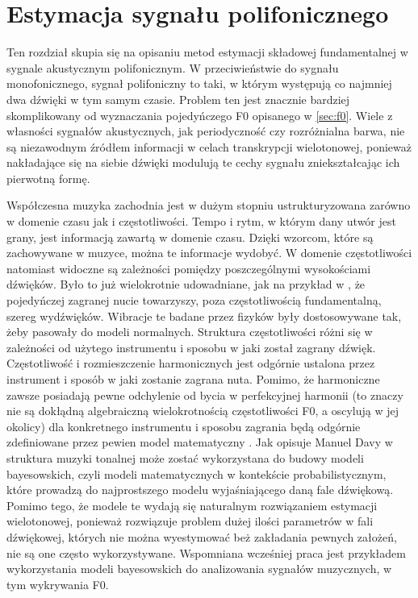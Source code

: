 \documentclass[12pt,a4paper,twoside]{mwart}
\begin{document}
\clearpage
\section{Estymacja sygnału polifonicznego}\label{sec:MultiPitch}
Ten rozdział skupia się na opisaniu metod estymacji składowej fundamentalnej w sygnale akustycznym polifonicznym. W przeciwieństwie do sygnału monofonicznego,  sygnał polifoniczny to taki, w którym występują co najmniej dwa dźwięki w tym samym czasie. Problem ten jest znacznie bardziej skomplikowany od wyznaczania pojedyńczego F0 opisanego w \ref{sec:f0}. Wiele z własności sygnałów akustycznych, jak periodyczność czy rozróżnialna barwa, nie są niezawodnym źródłem informacji w celach transkrypcji wielotonowej, ponieważ nakładające się na siebie dźwięki modulują te cechy sygnału zniekształcając ich pierwotną formę.

Współczesna muzyka zachodnia jest w dużym stopniu ustrukturyzowana zarówno w domenie czasu jak i częstotliwości. Tempo i rytm, w którym dany utwór jest grany, jest informacją zawartą w domenie czasu. Dzięki wzorcom, które są zachowywane w muzyce, można te informacje wydobyć. W domenie częstotliwości natomiast widoczne są zależności pomiędzy poszczególnymi wysokościami dźwięków. Było to już wielokrotnie udowadniane, jak na przykład w \cite[1325-1326]{Transcription:Mcintyre:OnTheOscilation}, że pojedyńczej zagranej nucie towarzyszy, poza częstotliwością fundamentalną, szereg wydźwięków. Wibracje te badane przez fizyków były dostosowywane tak, żeby pasowały do modeli normalnych. Struktura częstotliwości różni się w zależności od użytego instrumentu i sposobu w jaki został zagrany dźwięk. Częstotliwość i rozmieszczenie harmonicznych jest odgórnie ustalona przez instrument i sposób w jaki zostanie zagrana nuta. Pomimo, że harmoniczne zawsze posiadają pewne odchylenie od bycia w perfekcyjnej harmonii (to znaczy nie są dokłądną algebraiczną wielokrotnością częstotliwości F0, a oscylują w jej okolicy) dla konkretnego instrumentu i sposobu zagrania będą odgórnie zdefiniowane przez pewien model matematyczny \cite[1326-1327]{Transcription:Mcintyre:OnTheOscilation}. Jak opisuje Manuel Davy w \cite[203-204]{Transcription:Anssi:SignalProcessingMethods} struktura muzyki tonalnej może zostać wykorzystana do budowy modeli bayesowskich, czyli modeli matematycznych w kontekście probabilistycznym, które prowadzą do najprostszego modelu wyjaśniającego daną fale dźwiękową. Pomimo tego, że modele te wydają się naturalnym rozwiązaniem estymacji wielotonowej, ponieważ rozwiązuje problem dużej ilości parametrów w fali dźwiękowej, których nie można wyestymować beż zakładania pewnych założeń, nie są one często wykorzystywane. Wspomniana wcześniej praca \cite{Transcription:BayesianHarmonicModels} jest przykładem wykorzystania modeli bayesowskich do analizowania sygnałów muzycznych, w tym wykrywania F0.
\end{document}
